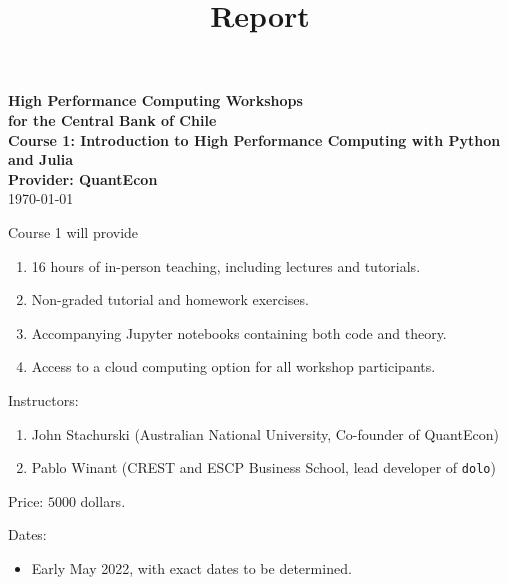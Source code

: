 \documentclass[12pt]{article}
\begin{document}
\title{Report}

\date{}


\begin{center}
    {\bf {\Large High Performance Computing Workshops \\
            for the Central Bank of Chile
    \\
    \vspace{1em}
    {\Large Course 1: Introduction to High Performance Computing with Python and Julia}
    \\
    \vspace{1em}
    Provider: QuantEcon \\
    }}
    \vspace{1em}
    \today
\end{center}


\vspace{.01in}







\thispagestyle{fancy}
Course 1 will provide 
%
\begin{enumerate}
    \item 16 hours of in-person teaching, including lectures and
        tutorials.
    \item Non-graded tutorial and homework exercises.
    \item Accompanying Jupyter notebooks containing both code and theory.
    \item Access to a cloud computing option for all workshop participants.
\end{enumerate}

Instructors:
%
\begin{enumerate}
    \item John Stachurski (Australian National University, Co-founder of QuantEcon)
    \item Pablo Winant (CREST and ESCP Business School, lead developer of \texttt{dolo})
\end{enumerate}

Price: $5000$ dollars.

Dates: 
%
\begin{itemize}
    \item Early May 2022, with exact dates to be determined.
\end{itemize}
\end{document}
